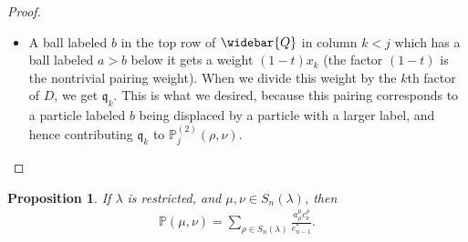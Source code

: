 \documentclass[12pt]{amsart}
\newtheorem{prop}[thm]{Proposition}
\theoremstyle{definition}
\DeclareMathOperator{\wt}{wt}
\newcommand{\Qbar}{\widebar{Q}}
\newcommand{\PP}{\mathbb P}
\newcommand{\PPtwo}[1]{\mathbb P^{(2)}_{#1}}
\newcommand{\mfp}{\mathfrak p}
\newcommand{\mfq}{\mathfrak q}
\begin{document}
\begin{proof}
\begin{itemize}
    to $\PPtwo{j}(\rho,\nu)$.
    \item A ball labeled $b$ in the top row of 
    $\Qbar$ in column $k<j$ which has a ball labeled $a>b$ below it gets a weight $(1-t)x_k$ (the factor $(1-t)$ is the nontrivial pairing weight). 
     When we divide this weight by the $k$th factor of $D$, we get $\mfq_k$.  This is what we desired, because this pairing
    corresponds to a particle labeled $b$ being displaced by a particle with a larger label, and hence contributing $\mfq_k$ to $\PPtwo{j}(\rho,\nu)$.\qedhere
\end{itemize}
\end{proof}

\begin{prop}\label{prop:intTASEP_SMLQ}
If $\lambda$ is restricted, and $\mu,\nu\in S_n(\lambda)$, then    
\begin{align*}
    \PP(\mu,\nu)=\sum_{\rho\in S_n(\lambda)}  \frac{a^\mu_\rho c^\rho_{\nu}}{e^*_{n-1}}.
\end{align*}
\end{prop}
\end{document}
